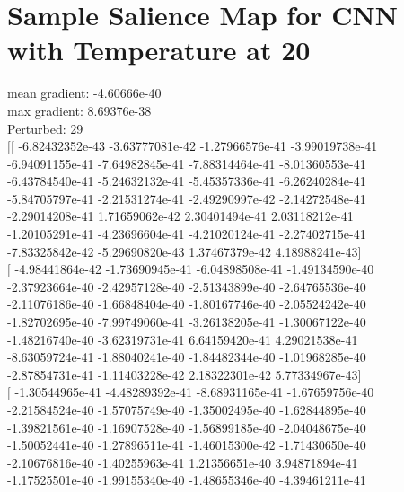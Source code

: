 \documentclass{article}
\begin{document}
\section{Sample Salience Map for CNN with Temperature at 20}
mean gradient: -4.60666e-40\\
max gradient: 8.69376e-38\\
Perturbed: 29\\
$[$[ -6.82432352e-43  -3.63777081e-42  -1.27966576e-41  -3.99019738e-41\\
   -6.94091155e-41  -7.64982845e-41  -7.88314464e-41  -8.01360553e-41\\
   -6.43784540e-41  -5.24632132e-41  -5.45357336e-41  -6.26240284e-41\\
   -5.84705797e-41  -2.21531274e-41  -2.49290997e-42  -2.14272548e-41\\
   -2.29014208e-41   1.71659062e-42   2.30401494e-41   2.03118212e-41\\
   -1.20105291e-41  -4.23696604e-41  -4.21020124e-41  -2.27402715e-41\\
   -7.83325842e-42  -5.29690820e-43   1.37467379e-42   4.18988241e-43$]$\\
 $[$ -4.98441864e-42  -1.73690945e-41  -6.04898508e-41  -1.49134590e-40\\
   -2.37923664e-40  -2.42957128e-40  -2.51343899e-40  -2.64765536e-40\\
   -2.11076186e-40  -1.66848404e-40  -1.80167746e-40  -2.05524242e-40\\
   -1.82702695e-40  -7.99749060e-41  -3.26138205e-41  -1.30067122e-40\\
   -1.48216740e-40  -3.62319731e-41   6.64159420e-41   4.29021538e-41\\
   -8.63059724e-41  -1.88040241e-40  -1.84482344e-40  -1.01968285e-40\\
   -2.87854731e-41  -1.11403228e-42   2.18322301e-42   5.77334967e-43$]$\\
 $[$ -1.30544965e-41  -4.48289392e-41  -8.68931165e-41  -1.67659756e-40\\
   -2.21584524e-40  -1.57075749e-40  -1.35002495e-40  -1.62844895e-40\\
   -1.39821561e-40  -1.16907528e-40  -1.56899185e-40  -2.04048675e-40\\
   -1.50052441e-40  -1.27896511e-41  -1.46015300e-42  -1.71430650e-40\\
   -2.10676816e-40  -1.40255963e-41   1.21356651e-40   3.94871894e-41\\
   -1.17525501e-40  -1.99155340e-40  -1.48655346e-40  -4.39461211e-41\\
\end{document}
